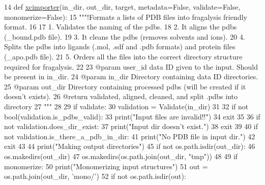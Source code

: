 \begin{DoxyCode}
14 \textcolor{keyword}{def }\hyperlink{namespacefragalysis__api_1_1xcimporter_1_1xcimporter_a673f390dc6b7d0062ec8d9510079dded}{xcimporter}(in\_dir, out\_dir, target, metadata=False, validate=False, monomerize=False):
15     \textcolor{stringliteral}{"""!Formats a lists of PDB files into fragalysis friendly format.}
16 \textcolor{stringliteral}{    }
17 \textcolor{stringliteral}{    1. Validates the naming of the pdbs.}
18 \textcolor{stringliteral}{    2. It aligns the pdbs (\_bound.pdb file).}
19 \textcolor{stringliteral}{    3. It cleans the pdbs (removes solvents and ions).}
20 \textcolor{stringliteral}{    4. Splits the pdbs into ligands (.mol, .sdf and .pdb formats) and protein files (\_apo.pdb file).}
21 \textcolor{stringliteral}{    5. Orders all the files into the correct directory structure required for fragalysis.}
22 \textcolor{stringliteral}{}
23 \textcolor{stringliteral}{    @param user\_id data ID given to the input. Should be present in in\_dir.}
24 \textcolor{stringliteral}{    @param in\_dir Directory containing data ID directories.}
25 \textcolor{stringliteral}{    @param out\_dir Directory containing processed pdbs (will be created if it doesn't exists).}
26 \textcolor{stringliteral}{    @return validated, aligned, cleaned, and split .pdbs into directory}
27 \textcolor{stringliteral}{    """}
28 
29     \textcolor{keywordflow}{if} validate:
30         validation = Validate(in\_dir)
31 
32         \textcolor{keywordflow}{if} \textcolor{keywordflow}{not} bool(validation.is\_pdbs\_valid):
33             print(\textcolor{stringliteral}{"Input files are invalid!!"})
34             exit
35 
36         \textcolor{keywordflow}{if} \textcolor{keywordflow}{not} validation.does\_dir\_exist:
37             print(\textcolor{stringliteral}{"Input dir doesn't exist."})
38             exit
39 
40         \textcolor{keywordflow}{if} \textcolor{keywordflow}{not} validation.is\_there\_a\_pdb\_in\_dir:
41             print(\textcolor{stringliteral}{"No PDB file in input dir."})
42             exit
43 
44     print(\textcolor{stringliteral}{"Making output directories"})
45     \textcolor{keywordflow}{if} \textcolor{keywordflow}{not} os.path.isdir(out\_dir):
46         os.makedirs(out\_dir)
47         os.makedirs(os.path.join(out\_dir, \textcolor{stringliteral}{"tmp"}))
48 
49     \textcolor{keywordflow}{if} monomerize:
50         print(\textcolor{stringliteral}{"Monomerizing input structures"})
51         out = os.path.join(out\_dir, \textcolor{stringliteral}{'mono/'})
52         \textcolor{keywordflow}{if} \textcolor{keywordflow}{not} os.path.isdir(out):

\end{DoxyCode}
